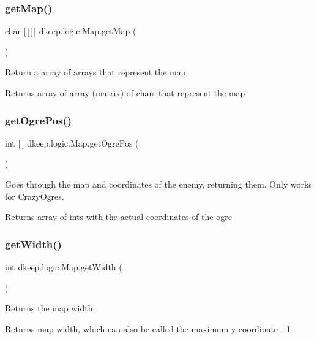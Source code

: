 \subsubsection{\texorpdfstring{get\+Map()}{getMap()}}
{\footnotesize\ttfamily char \mbox{[}$\,$\mbox{]}\mbox{[}$\,$\mbox{]} dkeep.\+logic.\+Map.\+get\+Map (\begin{DoxyParamCaption}{ }\end{DoxyParamCaption})}

Return a array of arrays that represent the map. \begin{DoxyReturn}{Returns}
array of array (matrix) of chars that represent the map 
\end{DoxyReturn}
\mbox{\label{classdkeep_1_1logic_1_1_map_a8dae121a32549da2035765a886f92d68}} 
\subsubsection{\texorpdfstring{get\+Ogre\+Pos()}{getOgrePos()}}
{\footnotesize\ttfamily int \mbox{[}$\,$\mbox{]} dkeep.\+logic.\+Map.\+get\+Ogre\+Pos (\begin{DoxyParamCaption}{ }\end{DoxyParamCaption})}

Goes through the map and coordinates of the enemy, returning them. Only works for Crazy\+Ogres. \begin{DoxyReturn}{Returns}
array of ints with the actual coordinates of the ogre 
\end{DoxyReturn}
\mbox{\label{classdkeep_1_1logic_1_1_map_ad066c2de42a31b55a7649149cac143b2}} 
\subsubsection{\texorpdfstring{get\+Width()}{getWidth()}}
{\footnotesize\ttfamily int dkeep.\+logic.\+Map.\+get\+Width (\begin{DoxyParamCaption}{ }\end{DoxyParamCaption})}

Returns the map width. \begin{DoxyReturn}{Returns}
map width, which can also be called the maximum y coordinate -\/ 1 
\end{DoxyReturn}
\mbox{\label{classdkeep_1_1logic_1_1_map_a821f7fc33840cec683d9fe1d7146a3a5}} 
